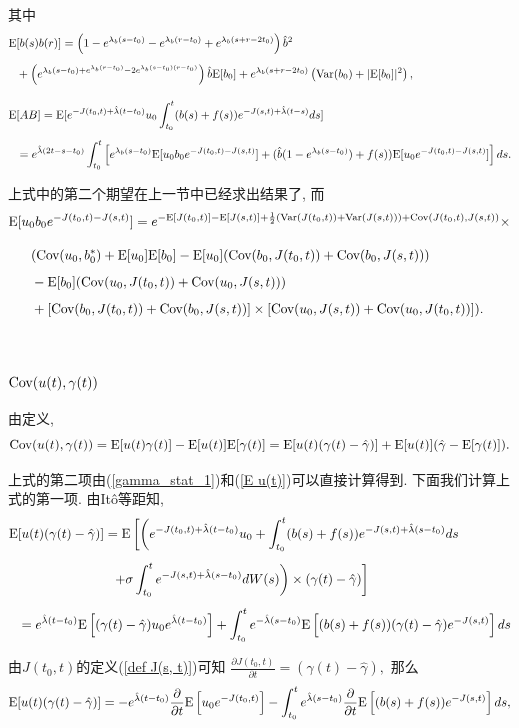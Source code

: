 \documentclass[notitlepage,cs4size,punct,oneside]{ctexrep}
\numberwithin{equation}{section}
\theoremstyle{mystyle}
\newcommand{\nq}{\\[5pt]}
\newcommand{\nw}{\\[10pt]}
\begin{document}
其中
\[
\begin{split}
\E&[b(s)b(r)] = \left(1-e^{\lambda_b(s-t_0)}-e^{\lambda_b(r-t_0)}+e^{\lambda_b(s+r-2t_0)}\right)\hat{b}^2 \nq
&+ \left(e^{\lambda_b(s-t_0)+e^{\lambda_b(r-t_0)}-2e^{\lambda_b(s-t_0)(r-t_0)}}\right)\hat{b}\E[b_0] + e^{\lambda_b(s+r-2t_0)}\left(\Var(b_0)+|\E[b_0]|^2\right), \nw
\E&[AB] = \E[e^{-J(t_0, t)+\hat{\lambda}(t-t_0)}u_0\int_{t_0}^t (b(s)+f(s))e^{-J(s, t)+\hat\lambda(t-s)}ds] \nq
&= e^{\hat\lambda(2t-s-t_0)}\int_{t_0}^t \left[e^{\lambda_b(s-t_0)}\E[u_0b_0e^{-J(t_0, t)-J(s, t)}]+(\hat{b}(1-e^{\lambda_b(s-t_0)})+f(s))\E[u_0e^{-J(t_0, t)-J(s, t)}]\right]ds.
\end{split}
\]

上式中的第二个期望在上一节中已经求出结果了, 而
\[
\begin{split}
\E&[u_0b_0e^{-J(t_0, t)-J(s, t)}] = e^{-\E[J(t_0, t)]-\E[J(s, t)]+\frac{1}{2}(\Var(J(t_0, t))+\Var(J(s, t)))+\Cov(J(t_0, t), J(s, t))}\times \nw
&\quad (\Cov(u_0, b_0^*)+\E[u_0]\E[b_0]-\E[u_0](\Cov(b_0, J(t_0, t))+\Cov(b_0, J(s, t)))\nq
&\quad -\E[b_0](\Cov(u_0, J(t_0, t))+\Cov(u_0, J(s, t)))\nq
&\quad +[\Cov(b_0, J(t_0, t))+\Cov(b_0, J(s, t))]\times[\Cov(u_0, J(s, t))+\Cov(u_0, J(t_0, t))]).
\end{split}
\]
\\

\subsubsection{$\text{Cov}(u(t), \gamma(t))$}
由定义,
\[
\text{Cov}(u(t), \gamma(t)) = \text{E}[u(t)\gamma(t)] - \text{E}[u(t)]\text{E}[\gamma(t)] = \text{E}[u(t)(\gamma(t)-\hat\gamma)] + \text{E}[u(t)](\hat\gamma-\text{E}[\gamma(t)]). 
\]

上式的第二项由(\ref{gamma_stat_1})和(\ref{E u(t)})可以直接计算得到. 下面我们计算上式的第一项. 由It\^o等距知,
\[
\begin{split}
\E&[u(t)(\gamma(t)-\hat\gamma)] = \E\left[\left(e^{-J(t_0, t)+\hat\lambda(t-t_0)}u_0+\int_{t_0}^t(b(s)+f(s))e^{-J(s, t)+\hat\lambda(s-t_0)}ds\right.\right. \nq
&\quad\quad\quad\quad\quad\quad\quad \left.\left.+\sigma\int_{t_0}^t e^{-J(s, t)+\hat\lambda(s-t_0)}dW(s)\right)\times(\gamma(t)-\hat\gamma)\right] \nq
&= e^{\hat\lambda(t-t_0)}\E\left[(\gamma(t)-\hat\gamma)u_0e^{\hat\lambda(t-t_0)}\right]+\int_{t_0}^t e^{-\hat\lambda(s-t_0)}\E\left[(b(s)+f(s))(\gamma(t)-\hat\gamma)e^{-J(s, t)}\right]ds
\end{split}
\]

由$J(t_0, t)$的定义(\ref{def J(s, t)})可知
$
\frac{\partial J(t_0, t)}{\partial t} = (\gamma(t)-\hat\gamma),
$
那么\\
\[
\text{E}[u(t)(\gamma(t)-\hat\gamma)] = -e^{\hat\lambda(t-t_0)}\frac{\partial}{\partial t}\text{E}\left[u_0e^{-J(t_0, t)}\right]-\int_{t_0}^t e^{\hat\lambda(s-t_0)}\frac{\partial}{\partial t}\text{E}\left[(b(s)+f(s))e^{-J(s, t)}\right]ds,
\]
\end{document}
